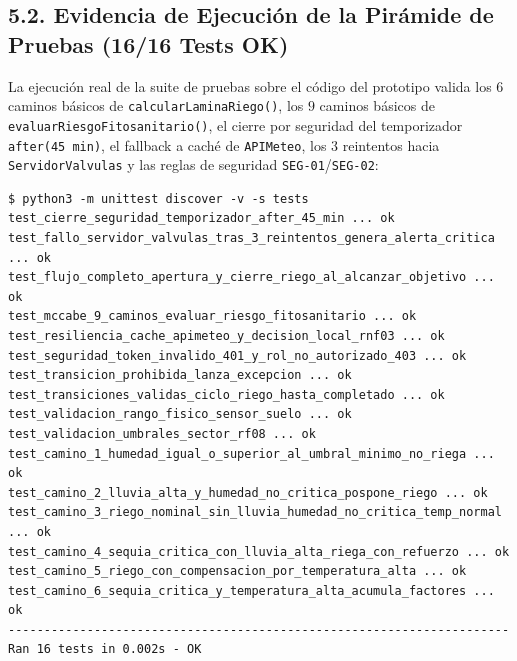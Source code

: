 \documentclass[12pt,letterpaper]{report}
\begin{document}
\subsection*{5.2. Evidencia de Ejecución de la Pirámide de Pruebas (16/16 Tests OK)}

La ejecución real de la suite de pruebas sobre el código del prototipo valida los $6$ caminos básicos de \texttt{calcularLaminaRiego()}, los $9$ caminos básicos de \texttt{evaluarRiesgoFitosanitario()}, el cierre por seguridad del temporizador \texttt{after(45 min)}, el fallback a caché de \texttt{APIMeteo}, los $3$ reintentos hacia \texttt{ServidorValvulas} y las reglas de seguridad \texttt{SEG-01}/\texttt{SEG-02}:

\begin{lstlisting}[style=pythonstyle, caption={Salida verificada de la suite de pruebas unitarias y de integración.}]
$ python3 -m unittest discover -v -s tests
test_cierre_seguridad_temporizador_after_45_min ... ok
test_fallo_servidor_valvulas_tras_3_reintentos_genera_alerta_critica ... ok
test_flujo_completo_apertura_y_cierre_riego_al_alcanzar_objetivo ... ok
test_mccabe_9_caminos_evaluar_riesgo_fitosanitario ... ok
test_resiliencia_cache_apimeteo_y_decision_local_rnf03 ... ok
test_seguridad_token_invalido_401_y_rol_no_autorizado_403 ... ok
test_transicion_prohibida_lanza_excepcion ... ok
test_transiciones_validas_ciclo_riego_hasta_completado ... ok
test_validacion_rango_fisico_sensor_suelo ... ok
test_validacion_umbrales_sector_rf08 ... ok
test_camino_1_humedad_igual_o_superior_al_umbral_minimo_no_riega ... ok
test_camino_2_lluvia_alta_y_humedad_no_critica_pospone_riego ... ok
test_camino_3_riego_nominal_sin_lluvia_humedad_no_critica_temp_normal ... ok
test_camino_4_sequia_critica_con_lluvia_alta_riega_con_refuerzo ... ok
test_camino_5_riego_con_compensacion_por_temperatura_alta ... ok
test_camino_6_sequia_critica_y_temperatura_alta_acumula_factores ... ok
----------------------------------------------------------------------
Ran 16 tests in 0.002s - OK
\end{lstlisting}
\end{document}
